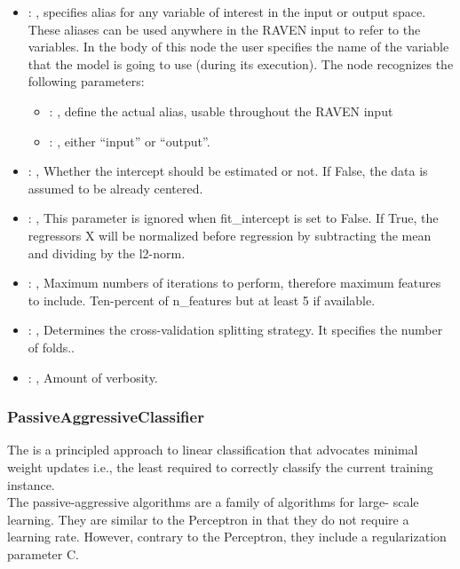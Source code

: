 \begin{itemize}
    \item {}: , 
      specifies alias for         any variable of interest in the input or output space. These
      aliases can be used anywhere in the RAVEN input to         refer to the variables. In the body
      of this node the user specifies the name of the variable that the model is going to use
      (during its execution).
      The  node recognizes the following parameters:
        \begin{itemize}
          \item {}: , 
            define the actual alias, usable throughout the RAVEN input
          \item {}: , 
            either ``input'' or ``output''.
      \end{itemize}

    \item {}: , 
      Whether the intercept should be estimated or not. If False,
      the data is assumed to be already centered.

    \item {}: , 
      This parameter is ignored when fit\_intercept is set to False. If True,
      the regressors X will be normalized before regression by subtracting the mean and
      dividing by the l2-norm.

    \item {}: , 
      Maximum numbers of iterations to perform, therefore maximum
      features to include. Ten-percent of n\_features but at least 5 if available.

    \item {}: , 
      Determines the cross-validation splitting strategy.
      It specifies the number of folds..

    \item {}: , 
      Amount of verbosity.
  \end{itemize}


\subsubsection{PassiveAggressiveClassifier}
  The                          is a principled approach to
  linear                         classification that advocates minimal weight updates i.e., the
  least required                         to correctly classify the current training instance.
  \\The passive-aggressive algorithms are a family of algorithms for                         large-
  scale learning. They are similar to the Perceptron in that they                         do not
  require a learning rate. However, contrary to the Perceptron,                         they include
  a regularization parameter C.

